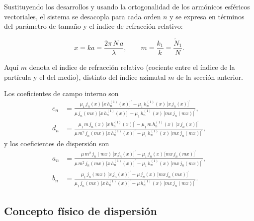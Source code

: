 Sustituyendo los desarrollos y usando la ortogonalidad de los armónicos
esféricos vectoriales, el sistema se desacopla para cada orden $n$ y se
expresa en términos del parámetro de tamaño y el índice de refracción relativo:

\begin{equation}
  \label{eq:size_parameter}
  x = ka = \frac{2\pi\,N\,a}{\lambda},
  \qquad
  m = \frac{k_1}{k} = \frac{\tilde{N}_1}{N}.
\end{equation}

Aquí $m$ denota el índice de refracción relativo (cociente entre el
índice de la partícula y el del medio), distinto del índice azimutal $m$ de la
sección anterior.

Los coeficientes de campo interno son
\begin{align}
  \label{eq:internalcoef}
c_n &=
\frac{
  \mu_1\, j_n(x)\,\bigl[x\, h_n^{(1)}(x)\bigr]^{\prime}
  - \mu_1\, h_n^{(1)}(x)\,\bigl[x\, j_n(x)\bigr]^{\prime}
}{
  \mu\, j_n(mx)\,\bigl[x\, h_n^{(1)}(x)\bigr]^{\prime}
  - \mu_1\, h_n^{(1)}(x)\,\bigl[mx\, j_n(mx)\bigr]^{\prime}
},
\\[1em]
d_n &=
\frac{
  \mu_1\, m\, j_n(x)\,\bigl[x\, h_n^{(1)}(x)\bigr]^{\prime}
  - \mu_1\, m\, h_n^{(1)}(x)\,\bigl[x\, j_n(x)\bigr]^{\prime}
}{
  \mu\, m^2\, j_n(mx)\,\bigl[x\, h_n^{(1)}(x)\bigr]^{\prime}
  - \mu_1\, h_n^{(1)}(x)\,\bigl[mx\, j_n(mx)\bigr]^{\prime}
},
\end{align}
y los coeficientes de dispersión son
\begin{align}
  \label{eq:miecoef}
a_n &=
\frac{
  \mu\, m^2\, j_n(mx)\,\bigl[x\, j_n(x)\bigr]^{\prime}
  - \mu_1\, j_n(x)\,\bigl[mx\, j_n(mx)\bigr]^{\prime}
}{
  \mu\, m^2\, j_n(mx)\,\bigl[x\, h_n^{(1)}(x)\bigr]^{\prime}
  - \mu_1\, h_n^{(1)}(x)\,\bigl[mx\, j_n(mx)\bigr]^{\prime}
},
\\[1em]
\label{eq:miecoefb}
b_n &=
\frac{
  \mu_1\, j_n(mx)\,\bigl[x\, j_n(x)\bigr]^{\prime}
  - \mu\, j_n(x)\,\bigl[mx\, j_n(mx)\bigr]^{\prime}
}{
  \mu_1\, j_n(mx)\,\bigl[x\, h_n^{(1)}(x)\bigr]^{\prime}
  - \mu\, h_n^{(1)}(x)\,\bigl[mx\, j_n(mx)\bigr]^{\prime}
}.
\end{align}

\subsection{Concepto físico de dispersión}

